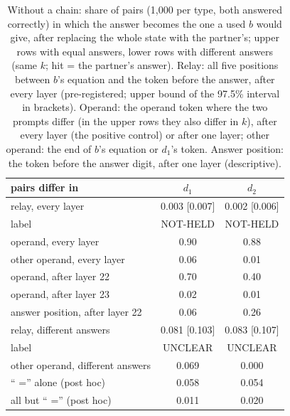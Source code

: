 \documentclass{article}
\begin{document}
\begin{table}[t]
\centering
\caption{Without a chain: share of pairs (1,000 per type, both answered correctly) in which the answer becomes the one a used $b$ would give, after replacing the whole state with the partner's; upper rows with equal answers, lower rows with different answers (same $k$; hit = the partner's answer). Relay: all five positions between $b$'s equation and the token before the answer, after every layer (pre-registered; upper bound of the 97.5\% interval in brackets). Operand: the operand token where the two prompts differ (in the upper rows they also differ in $k$), after every layer (the positive control) or after one layer; other operand: the end of $b$'s equation or $d_1$'s token. Answer position: the token before the answer digit, after one layer (descriptive).}
\label{tab:relay}
\footnotesize
\setlength{\tabcolsep}{3pt}
\begin{tabular}{@{}lcc@{}}
\toprule
pairs differ in & $d_1$ & $d_2$ \\
\midrule
relay, every layer & 0.003 [0.007] & 0.002 [0.006] \\
\quad label & NOT-HELD & NOT-HELD \\
operand, every layer & 0.90 & 0.88 \\
other operand, every layer & 0.06 & 0.01 \\
operand, after layer 22 & 0.70 & 0.40 \\
operand, after layer 23 & 0.02 & 0.01 \\
answer position, after layer 22 & 0.06 & 0.26 \\
\midrule
relay, different answers & 0.081 [0.103] & 0.083 [0.107] \\
\quad label & UNCLEAR & UNCLEAR \\
other operand, different answers & 0.069 & 0.000 \\
`` ='' alone (post hoc) & 0.058 & 0.054 \\
all but `` ='' (post hoc) & 0.011 & 0.020 \\
\bottomrule
\end{tabular}
\end{table}
\end{document}
